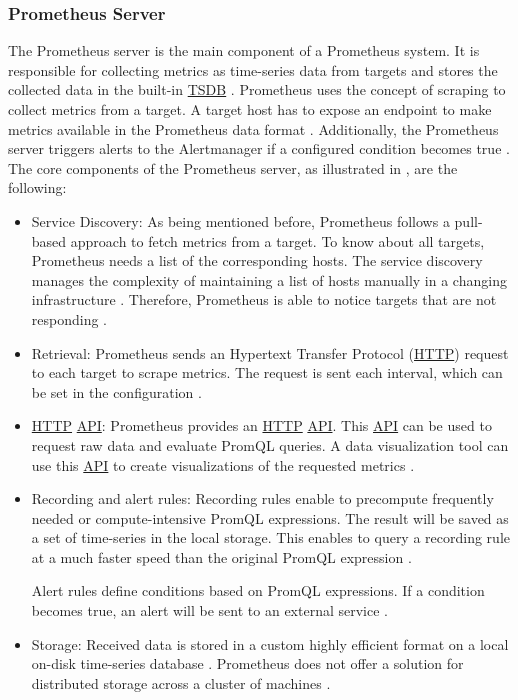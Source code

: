 \subsubsection{Prometheus Server}
The Prometheus server is the main component of a Prometheus system. It is responsible for collecting metrics as time-series data from targets and stores the collected data in the built-in \hyperlink{abbr:tsdb}{TSDB} \cite{Bastos2019Prom}. Prometheus uses the concept of scraping to collect metrics from a target. A target host has to expose an endpoint to make metrics available in the Prometheus data format \cite{Pandey2020Monitoring}. Additionally, the Prometheus server triggers alerts to the Alertmanager if a configured condition becomes true \cite{Prom2020Docs}.
The core components of the Prometheus server, as illustrated in , are the following:

\begin{itemize}
\item Service Discovery:
As being mentioned before, Prometheus follows a pull-based approach to fetch metrics from a target. To know about all targets, Prometheus needs a list of the corresponding hosts. The service discovery manages the complexity of maintaining a list of hosts manually in a changing infrastructure \cite{Bastos2019Prom}. Therefore, Prometheus is able to notice targets that are not responding \cite{Brazil2018Prom}.

\item Retrieval:
Prometheus sends an Hypertext Transfer Protocol (\hyperlink{abbr:http}{HTTP}) request to each target to scrape metrics. The request is sent each interval, which can be set in the configuration \cite{Brazil2018Prom}.

\item \hyperlink{abbr:http}{HTTP} \hyperlink{abbr:api}{API}:
Prometheus provides an \hyperlink{abbr:http}{HTTP} \hyperlink{abbr:api}{API}. This \hyperlink{abbr:api}{API} can be used to request raw data and evaluate PromQL queries.
A data visualization tool can use this \hyperlink{abbr:api}{API} to create visualizations of the requested metrics \cite{Brazil2018Prom}.

\item Recording and alert rules:
Recording rules enable to precompute frequently needed or compute-intensive PromQL expressions. The result will be saved as a set of time-series in the local storage. This enables to query a recording rule at a much faster speed than the original PromQL expression \cite{Brazil2018Prom, Prom2020Docs}.

Alert rules define conditions based on PromQL expressions. If a condition becomes true, an alert will be sent to an external service \cite{Prom2020Docs}.

\item Storage:
Received data is stored in a custom highly efficient format on a local on-disk time-series database \cite{Prom2020Docs}. Prometheus does not offer a solution for distributed storage across a cluster of machines \cite{Brazil2018Prom}.
\end{itemize}


